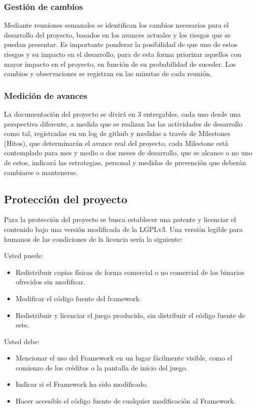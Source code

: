 \documentclass[]{article}
\begin{document}
\subsubsection{Gesti\'on de cambios}
Mediante reuniones semanales se identifican los cambios necesarios para el desarrollo del proyecto, basados en los avances actuales y los riesgos que se puedan presentar. Es importante ponderar la posibilidad de que uno de estos riesgos y su impacto en el desarrollo, para de esta forma priorizar aquellos con mayor impacto en el proyecto, en funci\'on de su probabilidad de suceder.
Los cambios y observaciones se registran en las minutas de cada reuni\'on.   

\subsubsection{Medici\'on de avances}

La documentaci\'on del proyecto se divir\'a en 3 entregables, cada uno desde una perspectiva diferente, a medida que se realizan las las actividades de desarrollo como tal, registradas en un log de github y medidas a trav\'es de Milestones (Hitos), que determinar\'an el avance real del proyecto, cada Milestone est\'a contemplado para mes y medio o dos meses de desarrollo, que se alcance o no uno de estos, indicar\'a las estrategias, personal y medidas de prevenci\'on que deber\'an cambiarse o mantenerse. 



\subsection{Protecci\'on del proyecto}
Para la protecci\'on del proyecto se busca establecer una patente y licenciar el contenido bajo una versi\'on modificada de la LGPLv3. Una versi\'on legible para humanos de las condiciones de la licencia ser\'ia la siguiente: 
\newline

Usted puede:
\begin{itemize}
	\item Redistribuir copias f\'isicas de forma comercial o no comercial de los binarios ofrecidos sin modificar. 
	\item Modificar el c\'odigo fuente del framework.
	\item Redistribuir y licenciar el juego producido, sin distribuir el c\'odigo fuente de este. 
\end{itemize}

Usted debe:
\begin{itemize}
	\item Mencionar el uso del Framework en un lugar f\'acilmente visible, como el comienzo de los cr\'editos o la pantalla de inicio del juego. 
	\item Indicar si el Framework ha sido modificado.
	\item Hacer accesible el c\'odigo fuente de cualquier modificaci\'on al Framework. 
\end{itemize}
\end{document}
